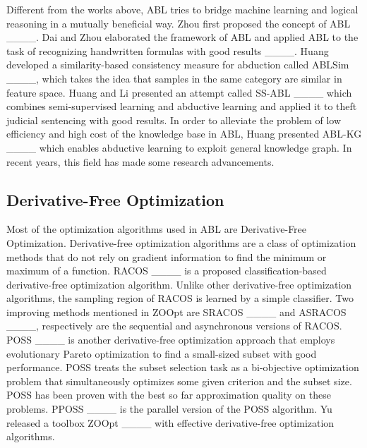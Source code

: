 Different from the works above, ABL tries to bridge machine learning and logical reasoning in a mutually beneficial way. Zhou first proposed the concept of ABL ____. Dai and Zhou elaborated the framework of ABL and applied ABL to the task of recognizing handwritten formulas with good results ____. Huang developed a similarity-based consistency measure for abduction called ABLSim ____, which takes the idea that samples in the same category are similar in feature space. Huang and Li presented an attempt called SS-ABL ____ which combines semi-supervised learning and abductive learning and applied it to theft judicial sentencing with good results. In order to alleviate the problem of low efficiency and high cost of the knowledge base in ABL, Huang presented ABL-KG ____ which enables abductive learning to exploit general knowledge graph. In recent years, this field has made some research advancements.
\subsection{Derivative-Free Optimization} 
Most of the optimization algorithms used in ABL are Derivative-Free Optimization. Derivative-free optimization algorithms are a class of optimization methods that do not rely on gradient information to find the minimum or maximum of a function. RACOS ____ is a proposed classification-based derivative-free optimization algorithm. Unlike other derivative-free optimization algorithms, the sampling region of RACOS is learned by a simple classifier. Two improving methods mentioned in ZOOpt are SRACOS ____ and ASRACOS ____,  respectively are the sequential and asynchronous versions of RACOS. POSS ____ is another derivative-free optimization approach that employs evolutionary Pareto optimization to find a small-sized subset with good performance. POSS treats the subset selection task as a bi-objective optimization problem that simultaneously optimizes some given criterion and the subset size. POSS has been proven with the best so far approximation quality on these problems. PPOSS ____ is the parallel version of the POSS algorithm.
Yu released a toolbox ZOOpt ____ with effective derivative-free optimization algorithms.